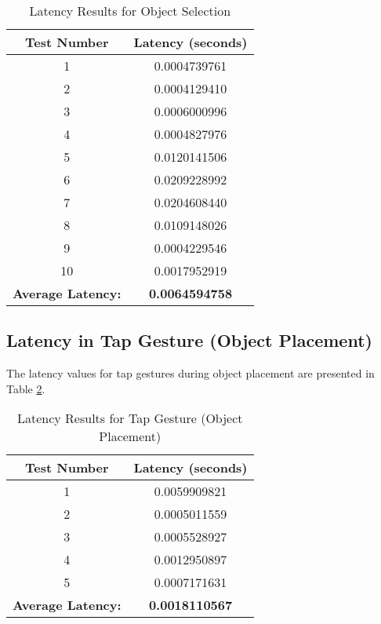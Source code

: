 \begin{table}[h!]
    \centering
    \caption{Latency Results for Object Selection}
    \label{tab:object_selection_latency}
    \begin{tabular}{|c|c|}
        \hline
        \textbf{Test Number} & \textbf{Latency (seconds)} \\
        \hline
        1 & 0.0004739761 \\
        2 & 0.0004129410 \\
        3 & 0.0006000996 \\
        4 & 0.0004827976 \\
        5 & 0.0120141506 \\
        6 & 0.0209228992 \\
        7 & 0.0204608440 \\
        8 & 0.0109148026 \\
        9 & 0.0004229546 \\
        10 & 0.0017952919 \\
        \hline
        \multicolumn{1}{|r|}{\textbf{Average Latency:}} & \textbf{0.0064594758} \\
        \hline
    \end{tabular}
\end{table}

\subsection{Latency in Tap Gesture (Object Placement)}
The latency values for tap gestures during object placement are presented in Table \ref{tab:tap_gesture_latency}.

\begin{table}[h!]
    \centering
    \caption{Latency Results for Tap Gesture (Object Placement)}
    \label{tab:tap_gesture_latency}
    \begin{tabular}{|c|c|}
        \hline
        \textbf{Test Number} & \textbf{Latency (seconds)} \\
        \hline
        1 & 0.0059909821 \\
        2 & 0.0005011559 \\
        3 & 0.0005528927 \\
        4 & 0.0012950897 \\
        5 & 0.0007171631 \\
        \hline
        \multicolumn{1}{|r|}{\textbf{Average Latency:}} & \textbf{0.0018110567} \\
        \hline
    \end{tabular}
\end{table}

